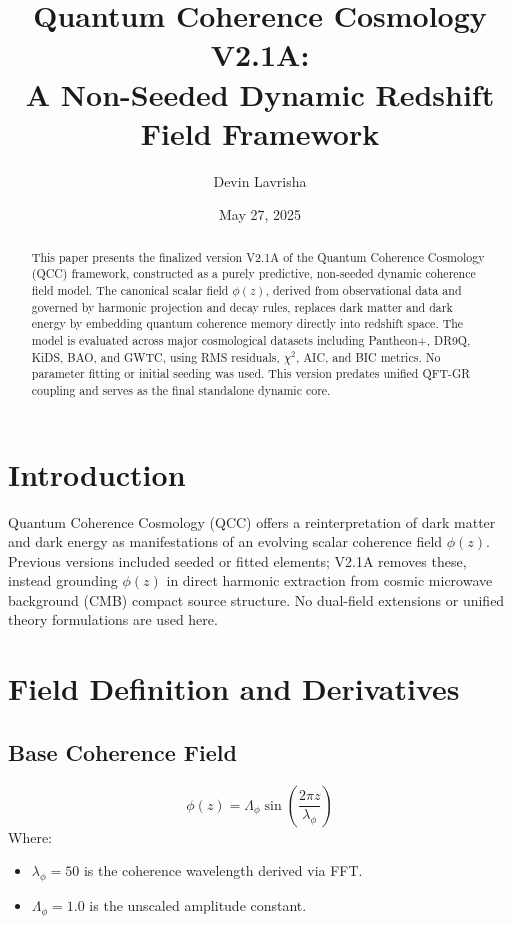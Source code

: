 \documentclass[11pt]{article}
\title{Quantum Coherence Cosmology V2.1A: \\
A Non-Seeded Dynamic Redshift Field Framework}
\author[1]{Devin Lavrisha}
\affil[1]{Quantum Coherence Project, Independent Researcher}
\date{May 27, 2025}
\begin{document}
\maketitle

\begin{abstract}
This paper presents the finalized version V2.1A of the Quantum Coherence Cosmology (QCC) framework, constructed as a purely predictive, non-seeded dynamic coherence field model. The canonical scalar field \( \phi(z) \), derived from observational data and governed by harmonic projection and decay rules, replaces dark matter and dark energy by embedding quantum coherence memory directly into redshift space. The model is evaluated across major cosmological datasets including Pantheon+, DR9Q, KiDS, BAO, and GWTC, using RMS residuals, $\chi^2$, AIC, and BIC metrics. No parameter fitting or initial seeding was used. This version predates unified QFT-GR coupling and serves as the final standalone dynamic core.
\end{abstract}

\section{Introduction}
Quantum Coherence Cosmology (QCC) offers a reinterpretation of dark matter and dark energy as manifestations of an evolving scalar coherence field \( \phi(z) \). Previous versions included seeded or fitted elements; V2.1A removes these, instead grounding \( \phi(z) \) in direct harmonic extraction from cosmic microwave background (CMB) compact source structure. No dual-field extensions or unified theory formulations are used here.

\section{Field Definition and Derivatives}
\subsection{Base Coherence Field}
\begin{equation}
\phi(z) = \Lambda_\phi \sin\left(\frac{2\pi z}{\lambda_\phi}\right)
\end{equation}
Where:
\begin{itemize}
  \item \( \lambda_\phi = 50 \) is the coherence wavelength derived via FFT.
  \item \( \Lambda_\phi = 1.0 \) is the unscaled amplitude constant.
\end{itemize}
\end{document}
